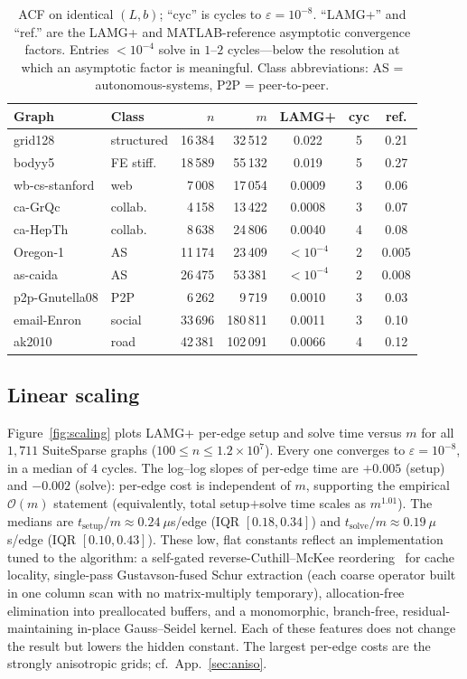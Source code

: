 \documentclass{siamart220329}
\newcommand{\Om}{\mathcal{O}(m)}
\begin{document}
\begin{table}[t]\centering\small
\caption{ACF on identical $(L,b)$; ``cyc'' is cycles to $\varepsilon=10^{-8}$.
``LAMG+'' and ``ref.'' are the LAMG+ and MATLAB-reference asymptotic convergence factors.
Entries $<10^{-4}$ solve in $1$--$2$ cycles---below the resolution at which an asymptotic
factor is meaningful. Class abbreviations: AS = autonomous-systems, P2P = peer-to-peer.}\label{tab:acf}
\begin{tabular}{llrrccc}
\toprule
Graph & Class & $n$ & $m$ & LAMG+ & cyc & ref.\\
\midrule
grid128        & structured  & 16\,384 & 32\,512  & 0.022      & 5 & 0.21\\
bodyy5         & FE stiff.   & 18\,589 & 55\,132  & 0.019      & 5 & 0.27\\
wb-cs-stanford & web         & 7\,008  & 17\,054  & 0.0009     & 3 & 0.06\\
ca-GrQc        & collab.     & 4\,158  & 13\,422  & 0.0008     & 3 & 0.07\\
ca-HepTh       & collab.     & 8\,638  & 24\,806  & 0.0040     & 4 & 0.08\\
Oregon-1       & AS          & 11\,174 & 23\,409  & $<10^{-4}$ & 2 & 0.005\\
as-caida       & AS          & 26\,475 & 53\,381  & $<10^{-4}$ & 2 & 0.008\\
p2p-Gnutella08 & P2P         & 6\,262  & 9\,719   & 0.0010     & 3 & 0.03\\
email-Enron    & social      & 33\,696 & 180\,811 & 0.0011     & 3 & 0.10\\
ak2010         & road        & 42\,381 & 102\,091 & 0.0066     & 4 & 0.12\\
\bottomrule
\end{tabular}
\end{table}

\subsection{Linear scaling}\label{sec:scaling}
Figure~\ref{fig:scaling} plots LAMG+ per-edge setup and solve time versus $m$ for all $1{,}711$
SuiteSparse graphs ($100\le n\le1.2\!\times\!10^7$). Every one converges to $\varepsilon=10^{-8}$, in a median of $4$ cycles. The log--log slopes of per-edge time are $+0.005$ (setup)
and $-0.002$ (solve): per-edge cost is independent of $m$, supporting the empirical $\Om$ statement
(equivalently, total setup$+$solve time scales as $m^{1.01}$). The medians are
$t_{\text{setup}}/m\approx0.24~\mu$s/edge (IQR $[0.18,0.34]$) and
$t_{\text{solve}}/m\approx0.19~\mu$s/edge (IQR $[0.10,0.43]$). These low, flat constants reflect an
implementation tuned to the algorithm: a self-gated reverse-Cuthill--McKee reordering~\cite{cuthill-mckee} for cache
locality, single-pass Gustavson-fused Schur extraction (each coarse operator built in one column scan
with no matrix-multiply temporary), allocation-free elimination into preallocated buffers, and a
monomorphic, branch-free, residual-maintaining in-place Gauss--Seidel kernel. Each of these features does not change the result but lowers the hidden constant.
The largest per-edge costs are the strongly anisotropic grids; cf.~App.~\ref{sec:aniso}.
\end{document}
